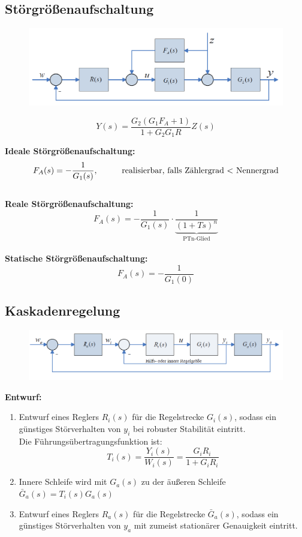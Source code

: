 \documentclass[10pt,a4paper]{article}
\newcommand{\tab}[1][1]{\hspace*{#1cm}}
\begin{document}
\subsection{Störgrößenaufschaltung}
\begin{figure}[H]
	\includegraphics[width=0.7\columnwidth]{imgs/abb7_4.png}
\end{figure}

$$
	Y(s) = \frac{G_2(G_1 F_A + 1)}{1 + G_2 G_1 R} Z(s)
$$

\textbf{Ideale Störgrößenaufschaltung:}
$$
	F_A(s) = -\frac{1}{G_1(s)}, \tab \text{realisierbar, falls Zählergrad $<$ Nennergrad}
$$ ~\\

\textbf{Reale Störgrößenaufschaltung:}
$$
	F_A(s) = -\frac{1}{G_1(s)} ⋅ \underbrace{\frac{1}{(1 + Ts)^n}}_{\text{PTn-Glied}}
$$ ~\\

\textbf{Statische Störgrößenaufschaltung:}
$$
	F_A(s) = -\frac{1}{G_1(0)}
$$

\subsection{Kaskadenregelung}
\begin{figure}[H]
	\includegraphics[width=0.8\columnwidth]{imgs/abb7_5.png}
\end{figure}

\textbf{Entwurf:}
\begin{enumerate}
	\item Entwurf eines Reglers $R_i(s)$ für die Regelstrecke $G_i(s)$, sodass ein günstiges Störverhalten von $y_i$ bei robuster Stabilität eintritt. \\
	Die Führungsübertragungsfunktion ist:
	$$
		T_i(s) = \frac{Y_i(s)}{W_i(s)} = \frac{G_i R_i}{1 + G_i R_i}
	$$
	\item Innere Schleife wird mit $G_a(s)$ zu der äußeren Schleife $\bar{G}_a(s) = T_i(s)G_a(s)$
	\item Entwurf eines Reglers $R_a(s)$ für die Regelstrecke $\bar G_a(s)$, sodass ein günstiges Störverhalten von $y_a$ mit zumeist stationärer Genauigkeit eintritt. \\
\end{enumerate}
\end{document}
